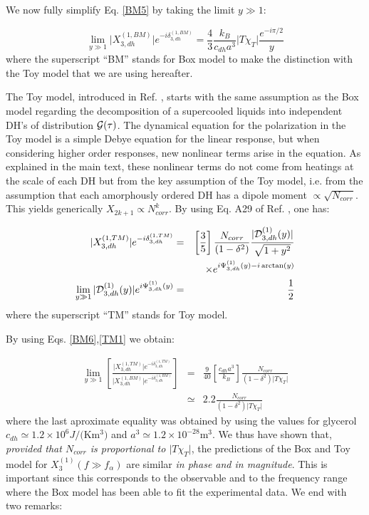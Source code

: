 \documentclass[single column,pre]{revtex4}
\begin{document}
We now fully simplify Eq. \ref{BM5} by taking the limit $y \gg 1$:

\begin{equation}
\lim_{y \gg 1} \vert X_{3,dh}^{(1,BM)} \vert e^{- i \delta_{3,dh}^{(1,BM)}} = \frac{4}{3} \frac{k_B}{c_{dh}a^3} \vert T \chi_T \vert \frac{e^{- i \pi/2}}{y}
\label{BM6}
\end{equation} 
where the superscript ``BM'' stands for Box model to make the distinction with the Toy model that we are using hereafter.

The Toy model, introduced in Ref. \cite{Lad12}, starts with the same assumption as the Box model regarding the decomposition of a supercooled liquids into independent DH's of distribution ${\cal G}(\tau)$. The dynamical equation for the polarization in the Toy model is a simple Debye equation for the linear response, but when considering higher order responses, new nonlinear terms arise in the equation. As explained in the main text, these nonlinear terms do not come from heatings at the scale of each DH but from the key assumption of the Toy model, i.e. from the assumption that each amorphously ordered DH has a dipole moment $\propto \sqrt{N_{corr}}$. This yields  generically $X_{2k+1} \propto N_{corr}^k$. By using Eq. A29 of Ref. \cite{Lad12}, one has:

\begin{eqnarray}
 \vert X_{3,dh}^{(1,TM)} \vert e^{- i\delta_{3,dh}^{(1,TM)}}&=&\left[ \frac{3}{5}\right]\frac{N_{corr}}{(1-\delta^2)}\frac{\vert {\cal D}_{3,dh}^{(1)}(y)\vert}{\sqrt{1+y^2}}
  \nonumber \\
\ & & \times e^{i\Psi_{3,dh}^{(1)}(y)-i\arctan(y)} \nonumber \\
 \lim_{y \gg 1} \vert {\cal D}_{3,dh}^{(1)}(y)\vert e^{i\Psi_{3,dh}^{(1)}(y)} &=& \frac{1}{2}
\label{TM1}
\end{eqnarray}
where the superscript ``TM'' stands for Toy model.

By using Eqs. \ref{BM6},\ref{TM1} we obtain:

\begin{eqnarray}
\lim_{y\gg 1}\left[ \frac{\vert X_{3,dh}^{(1,TM)} \vert e^{- i\delta_{3,dh}^{(1,TM)}}}{\vert X_{3,dh}^{(1,BM)} \vert e^{- i \delta_{3,dh}^{(1,BM)}}}\right] &=& \frac{9}{40}\left[\frac{c_{dh}a^3}{k_B}\right]\frac{N_{corr}}{(1-\delta^2)\vert T \chi_T \vert} \nonumber \\
\ &\simeq & 2.2 \frac{N_{corr}}{(1-\delta^2)\vert T \chi_T \vert}
\label{BM7}
\end{eqnarray}
where the last aproximate equality was obtained by using the values for glycerol $c_{dh} \simeq 1.2 \times 10^6 J/($Km$^3)$ and $a^3 \simeq 1.2 \times 10^{-28}$m$^3$. 
We thus have shown that, \textit{provided that $N_{corr}$ is proportional to $\vert T \chi_T\vert$}, the predictions of the Box and Toy model for $X_{3}^{(1)}(f \gg f_{\alpha})$ are 
similar \textit{in phase and in magnitude}. This is important since this corresponds to the observable and to the frequency range where 
the Box model has been able to fit the experimental data.  We end with two remarks:
\end{document}
